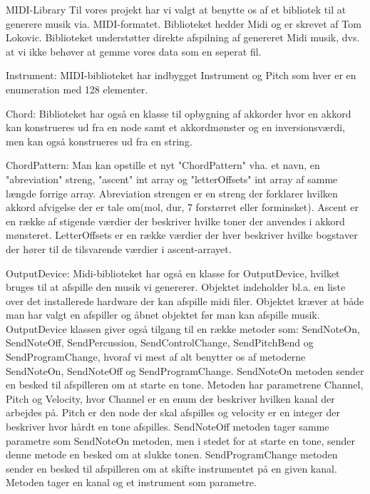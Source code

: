MIDI-Library
Til vores projekt har vi valgt at benytte os af et bibliotek til at generere musik via. MIDI-formatet. Biblioteket hedder Midi og er skrevet af Tom Lokovic. Biblioteket understøtter direkte afspilning af genereret Midi musik, dvs. at vi ikke behøver at gemme vores data som en seperat fil.

Instrument:
MIDI-biblioteket har indbygget Instrument og Pitch som hver er en enumeration med 128 elementer.

Chord:
Biblioteket har også en klasse til opbygning af akkorder hvor en akkord kan konstrueres ud fra en node samt et akkordmønster og en inversionsværdi, men kan også konstrueres ud fra en string.

ChordPattern:
Man kan opstille et nyt "ChordPattern" vha. et navn, en "abreviation" streng,  "ascent" int array og "letterOffsets" int array af samme længde forrige array.
Abreviation strengen er en streng der forklarer hvilken akkord afvigelse der er tale om(mol, dur, 7 forstørret eller forminsket).
Ascent er en række af stigende værdier der beskriver hvilke toner der anvendes i akkord mønsteret.
LetterOffsets er en række værdier der hver beskriver hvilke bogstaver der hører til de tilsvarende værdier i ascent-arrayet.

OutputDevice:
Midi-biblioteket har også en klasse for OutputDevice, hvilket bruges til at afspille den musik vi genererer. Objektet indeholder bl.a. en liste over det installerede hardware der kan afspille midi filer. Objektet kræver at både man har valgt en afspiller og åbnet objektet før man kan afspille musik.
OutputDevice klassen giver også tilgang til en række metoder som: SendNoteOn, SendNoteOff, SendPercussion, SendControlChange, SendPitchBend og SendProgramChange, hvoraf vi mest af alt benytter os af metoderne SendNoteOn, SendNoteOff og SendProgramChange.
SendNoteOn metoden sender en besked til afspilleren om at starte en tone.
Metoden har parametrene Channel, Pitch og Velocity, hvor Channel er en enum der beskriver hvilken kanal der arbejdes på. Pitch er den node der skal afspilles og velocity er en integer der beskriver hvor hårdt en tone afspilles.
SendNoteOff metoden tager samme parametre som SendNoteOn metoden, men i stedet for at starte en tone, sender denne metode en besked om at slukke tonen.
SendProgramChange metoden sender en besked til afspilleren om at skifte instrumentet på en given kanal. Metoden tager en kanal og et instrument som parametre.